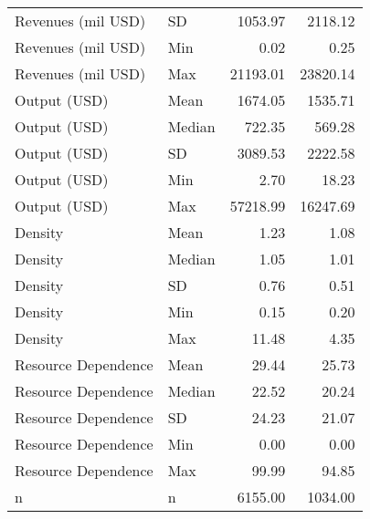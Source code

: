 \begin{table}[ht]
\begin{tabular}{llrr}
  Revenues (mil USD) & SD & 1053.97 & 2118.12 \\ 
  Revenues (mil USD) & Min & 0.02 & 0.25 \\ 
  Revenues (mil USD) & Max & 21193.01 & 23820.14 \\ 
  Output (USD) & Mean & 1674.05 & 1535.71 \\ 
  Output (USD) & Median & 722.35 & 569.28 \\ 
  Output (USD) & SD & 3089.53 & 2222.58 \\ 
  Output (USD) & Min & 2.70 & 18.23 \\ 
  Output (USD) & Max & 57218.99 & 16247.69 \\ 
  Density & Mean & 1.23 & 1.08 \\ 
  Density & Median & 1.05 & 1.01 \\ 
  Density & SD & 0.76 & 0.51 \\ 
  Density & Min & 0.15 & 0.20 \\ 
  Density & Max & 11.48 & 4.35 \\ 
  Resource Dependence & Mean & 29.44 & 25.73 \\ 
  Resource Dependence & Median & 22.52 & 20.24 \\ 
  Resource Dependence & SD & 24.23 & 21.07 \\ 
  Resource Dependence & Min & 0.00 & 0.00 \\ 
  Resource Dependence & Max & 99.99 & 94.85 \\ 
  n & n & 6155.00 & 1034.00 \\ 
   \hline
\end{tabular}
\end{table}
